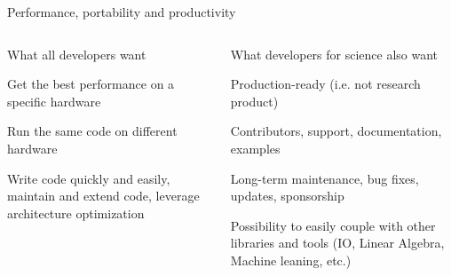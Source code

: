 \documentclass[aspectratio=169]{beamer}
\begin{document}
\begin{frame}{Performance, portability and productivity}
    \begin{columns}
        \begin{column}{0.45\linewidth}
            \begin{block}{What all developers want}
                \begin{description}[Performance]
                    \item[Performance] Get the best performance on a specific hardware
                    \item[Portability] Run the same code on different hardware
                    \item[Productivity] Write code quickly and easily, maintain and extend code, leverage architecture optimization
                \end{description}
            \end{block}
        \end{column}
        \begin{column}{0.55\linewidth}
            \begin{block}{What developers for science also want}
                \begin{description}[Interporability]
                    \item[Maturity] Production-ready (i.e. not research product)
                    \item[Community] Contributors, support, documentation, examples
                    \item[Longevity] Long-term maintenance, bug fixes, updates, sponsorship
                    \item[Interporability] Possibility to easily couple with other libraries and tools (IO, Linear Algebra, Machine leaning, etc.)
                \end{description}
            \end{block}
        \end{column}
    \end{columns}
\end{frame}

\end{document}
